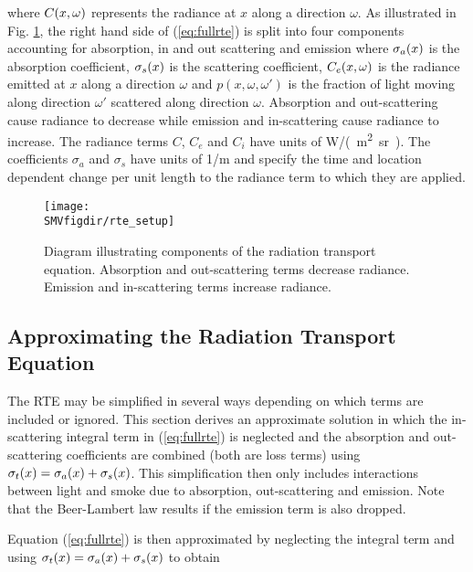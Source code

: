 \noindent where  $C(x,\omega)$ represents the  radiance at $x$ along a
direction $\omega$. As illustrated in Fig. \ref{figRadiance}, the
right hand side of (\ref{eq:fullrte}) is split into four
components accounting for absorption, in and out scattering and
emission where $\sigma_a(x)$ is the absorption coefficient, $\sigma_s(x)$ is
the scattering coefficient, $C_e(x,\omega)$ is the radiance emitted at $x$
along a direction $\omega$ and $p(x,\omega,\omega')$ is the
fraction of light moving along direction $\omega'$ scattered along
direction $\omega$. Absorption and out-scattering cause radiance
to decrease while emission and in-scattering cause radiance to
increase. The radiance terms $C$, $C_e$ and $C_i$ have units of
\si{W/(m^2.sr)}. The coefficients $\sigma_a$ and $\sigma_s$ have
units of \si{1/m} and specify the time and location dependent
change per unit length to the radiance term to which they are
applied.

\begin{figure}[bph]
\begin{center}
\texttt{[image: \\SMVfigdir/rte\_setup]}
\end{center}
\caption[Diagram illustrating components of the radiation
transport equation]{Diagram illustrating components of the
radiation transport equation.  Absorption and out-scattering terms
decrease radiance.  Emission and in-scattering terms increase
radiance.} \label{figRadiance}
\end{figure}


\subsection{Approximating the Radiation Transport Equation}

The RTE may be simplified in several ways depending on which terms
are included or ignored.  This section derives an approximate
solution in which the in-scattering integral term in
(\ref{eq:fullrte}) is neglected and the absorption and
out-scattering coefficients are combined (both are loss terms)
using $\sigma_t(x)=\sigma_a(x)+\sigma_s(x)$.  This simplification then only includes
interactions between light and smoke due to absorption,
out-scattering and emission.  Note that the Beer-Lambert law
results if the emission term is also dropped.

Equation (\ref{eq:fullrte}) is then approximated by neglecting the
integral term and using $\sigma_t(x)=\sigma_a(x)+\sigma_s(x)$ to obtain

